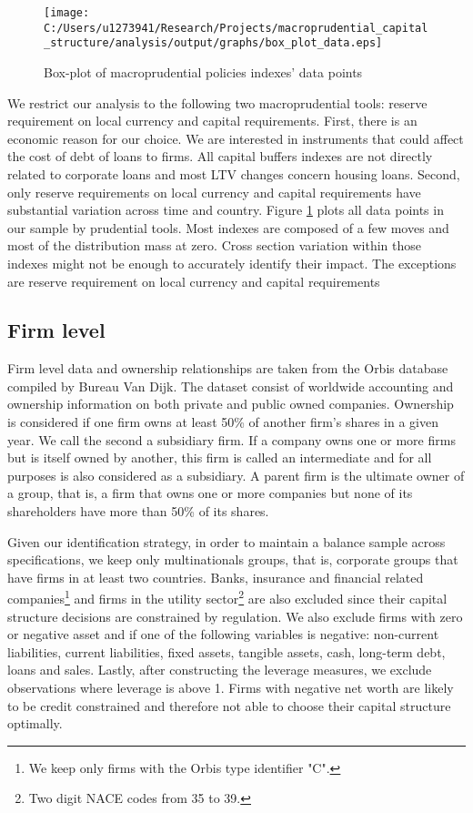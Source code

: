 \documentclass[12pt]{article}
\begin{document}
	  \begin{figure}[h!]
	  	\centering
	  	\caption{Box-plot of macroprudential policies indexes' data points}
	  	\texttt{[image: C:/Users/u1273941/Research/Projects/macroprudential\_capital\_structure/analysis/output/graphs/box\_plot\_data.eps]}
	  	\label{fig:boxplot data}
	  \end{figure}
  
	  We restrict our analysis to the following two macroprudential tools: reserve requirement on local currency and  capital requirements. First, there is an economic reason for our choice. We are interested in instruments that could affect the cost of debt of loans to firms. All capital buffers indexes are not directly related to corporate loans and most LTV changes concern housing loans. Second, only reserve requirements on local currency and capital requirements have substantial variation across time and country. Figure \ref{fig:boxplot data} plots all data points in our sample by prudential tools. Most indexes are composed of a few moves and most of the distribution mass at zero. Cross section variation within those indexes might not be enough to accurately identify their impact. The exceptions are reserve requirement on local currency and capital requirements 
	  	
 	\subsection{Firm level} \label{subsec:firm}
	Firm level data and ownership relationships are taken from the Orbis database compiled by Bureau Van Dijk.	The dataset consist of worldwide accounting and ownership information on both private and public owned companies. Ownership is considered if one firm owns at least 50\% of another firm's shares in a given year. We call the second a subsidiary firm. If a company owns one or more firms but is itself owned by another, this firm is called an intermediate and for all purposes is also considered as a subsidiary. A parent firm is the ultimate owner of a group, that is, a firm that owns one or more companies but none of its shareholders have more than 50\% of its shares.
	
	Given our identification strategy, in order to maintain a balance sample across specifications, we keep only multinationals groups, that is, corporate groups that have firms in at least two countries.  Banks, insurance and financial related companies\footnote{We keep only firms with the Orbis type identifier "C".} and firms in the utility sector\footnote{Two digit NACE codes from 35 to 39.} are also excluded since their capital structure decisions are constrained by regulation. We also exclude firms with zero or negative asset and if one of the following variables is negative: non-current liabilities, current liabilities, fixed assets, tangible assets, cash, long-term debt, loans and sales. Lastly, after constructing the leverage measures, we exclude observations where leverage is above 1. Firms with negative net worth are likely to be credit constrained and therefore not able to choose their capital structure optimally. 
	
\end{document}
